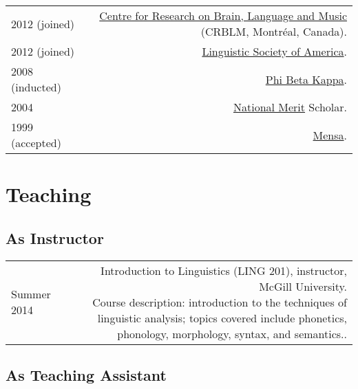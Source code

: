 \documentclass[letterpaper]{article}
\makeatletter
\newcommand{\bodywidth}{0.81}
\newcommand{\myvrule}{\color{lightgray}\vrule width 1.0pt}
\newenvironment{cvsection}{%
  \renewcommand{\arraystretch}{1.75}
  \begin{longtable}[l]{@{} L R @{}}
}{%
  \end{longtable}
}
\newcommand{\course}[2]{%
  \parbox[t]{\bodywidth\textwidth}{#1. \\ {\footnotesize Course description:
      #2.}}
}
\makeatother
\begin{document}
\begin{cvsection}
  2012 {\footnotesize (joined)} & \href{http://www.crblm.ca/}{Centre for
  Research on Brain, Language and Music} (CRBLM, Montr\'{e}al, Canada). \\

  2012 {\footnotesize (joined)} &
  \href{http://www.linguisticsociety.org/}{Linguistic Society of America}. \\

  2008 {\footnotesize (inducted)} & \href{http://www.pbk.org/}{Phi Beta Kappa}. \\

  2004 & \href{http://www.nationalmerit.org/}{National Merit} Scholar. \\

  1999 {\footnotesize (accepted)} & \href{http://www.mensa.org/}{Mensa}. \\
\end{cvsection}



\section*{Teaching}

\subsection*{As Instructor}

\begin{cvsection}
  {\small Summer} 2014 & \course{Introduction to Linguistics (LING 201),
    instructor, McGill University}{introduction to the techniques of linguistic
    analysis; topics covered include phonetics, phonology, morphology, syntax,
    and semantics.}
  \\[0.10ex]
\end{cvsection}

\vspace{-1ex}
\subsection*{As Teaching Assistant}
\end{document}
